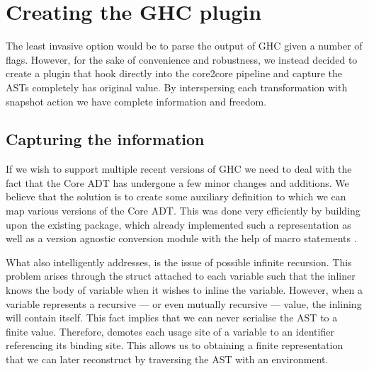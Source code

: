 %     
% 
%     
%   
%   
% 
% 
\section{Creating the GHC plugin}

The least invasive option would be to parse the output of GHC given a number of  flags. However, for the sake
of convenience and robustness, we instead decided to create a plugin that hook directly into the core2core pipeline and
capture the ASTs completely has original value. By interspersing each transformation with snapshot action we have complete information
and freedom. 

\subsection{Capturing the information}
\label{section:methods:capturing_info}

If we wish to support multiple recent versions of GHC we need to deal with the fact that the Core ADT has undergone
a few minor changes and additions. We believe that the solution is to create some auxiliary definition to which we can
map various versions of the Core ADT. This was done very efficiently by building upon the existing  package,
which already implemented such a representation as well as a version agnostic conversion module with the help of 
macro statements \cite{ghc_dump}. 

What  also intelligently addresses, is the issue of possible infinite recursion.
This problem arises through the  struct attached to each variable such that the inliner
knows the body of variable when it wishes to inline the variable. However, when a variable represents a recursive ---
or even mutually recursive --- value, the inlining will contain itself. This fact implies that we can never serialise 
the AST to a finite value. Therefore,  demotes each usage site of a variable to an identifier referencing its binding site.
This allows us to obtaining a finite representation that we can later reconstruct by traversing
the AST with an environment.

